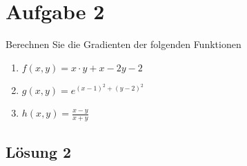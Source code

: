\documentclass[main.tex]{subfiles}
\begin{document}
\section{Aufgabe 2}
Berechnen Sie die Gradienten der folgenden Funktionen

\begin{enumerate}
    \item $f(x, y) = x \cdot y + x - 2y -2$
    \item $g(x, y) = e^{(x-1)^2 + (y-2)^2}$
    \item $h(x, y) = \frac{x-y}{x+y}$
\end{enumerate}

\subsection{Lösung 2}
\end{document}
